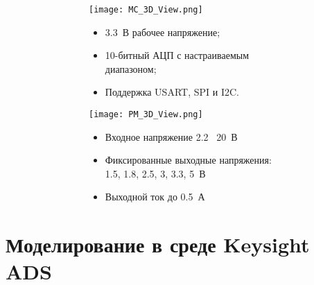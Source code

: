 \documentclass[c]{beamer}  %
\begin{document}
	\begin{frame}[shrink=20]
		\frametitle{\insertsection}
		\framesubtitle{\insertsubsection}
		\begin{center}
			\begin{figure}
				
				\begin{subfigure}{0.5\textwidth}
					\begin{subfigure}[t]{0.95\textwidth}
						\texttt{[image: MC\_3D\_View.png]}
					\end{subfigure}
					
					\begin{subfigure}[b]{0.95\textwidth}
						\begin{itemize}
							\item 3.3~В рабочее напряжение;
							\item 10-битный АЦП с настраиваемым диапазоном;
							\item Поддержка USART, SPI и I2C.
						\end{itemize}
					\end{subfigure}
				\end{subfigure}%
				\begin{subfigure}{0.5\textwidth}
					\begin{subfigure}[t]{0.95\textwidth}
						\texttt{[image: PM\_3D\_View.png]}
					\end{subfigure}
					
					\begin{subfigure}[b]{0.95\textwidth}
						\begin{itemize}
							\item Входное напряжение 2.2 \textdiv\  20~В 
							\item Фиксированные выходные напряжения: 1.5, 1.8, 2.5, 3, 3.3, 5~В
							\item Выходной ток до 0.5~А
						\end{itemize}
					\end{subfigure}
				\end{subfigure}
			\end{figure}
		
		\end{center}
	\end{frame}

\section{Моделирование в среде Keysight ADS}
\end{document}
